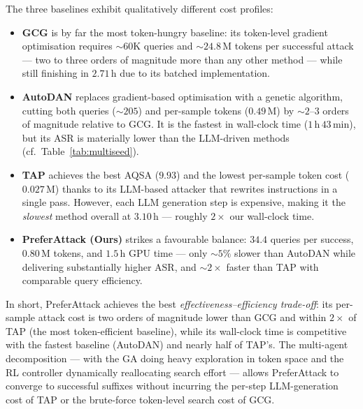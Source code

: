The three baselines exhibit qualitatively different cost profiles:
\begin{itemize}[leftmargin=*]
  \item \textbf{GCG} is by far the most token-hungry baseline: its
        token-level gradient optimisation requires $\sim\!60\text{K}$
        queries and $\sim\!24.8$\,M tokens per successful attack --- two
        to three orders of magnitude more than any other method --- while
        still finishing in $2.71$\,h due to its batched implementation.
  \item \textbf{AutoDAN} replaces gradient-based optimisation with a
        genetic algorithm, cutting both queries ($\sim\!205$) and
        per-sample tokens ($0.49$\,M) by $\sim\!2$--$3$ orders of
        magnitude relative to GCG. It is the fastest in wall-clock time
        ($1$\,h\,$43$\,min), but its ASR is materially lower than the
        LLM-driven methods (cf.\ Table~\ref{tab:multiseed}).
  \item \textbf{TAP} achieves the best AQSA ($9.93$) and the lowest
        per-sample token cost ($0.027$\,M) thanks to its LLM-based
        attacker that rewrites instructions in a single pass. However,
        each LLM generation step is expensive, making it the
        \emph{slowest} method overall at $3.10$\,h --- roughly
        $2\times$ our wall-clock time.
  \item \textbf{PreferAttack (Ours)} strikes a favourable balance:
        $34.4$ queries per success, $0.80$\,M tokens, and
        $1.5$\,h GPU time --- only $\sim\!5\%$ slower than AutoDAN
        while delivering substantially higher ASR, and $\sim\!2\times$
        faster than TAP with comparable query efficiency.
\end{itemize}

In short, PreferAttack achieves the best \emph{effectiveness--efficiency
trade-off}: its per-sample attack cost is two orders of magnitude lower
than GCG and within $2\times$ of TAP (the most token-efficient
baseline), while its wall-clock time is competitive with the fastest
baseline (AutoDAN) and nearly half of TAP's. The multi-agent
decomposition --- with the GA doing heavy exploration in token space
and the RL controller dynamically reallocating search effort ---
allows PreferAttack to converge to successful suffixes without
incurring the per-step LLM-generation cost of TAP or the brute-force
token-level search cost of GCG.

